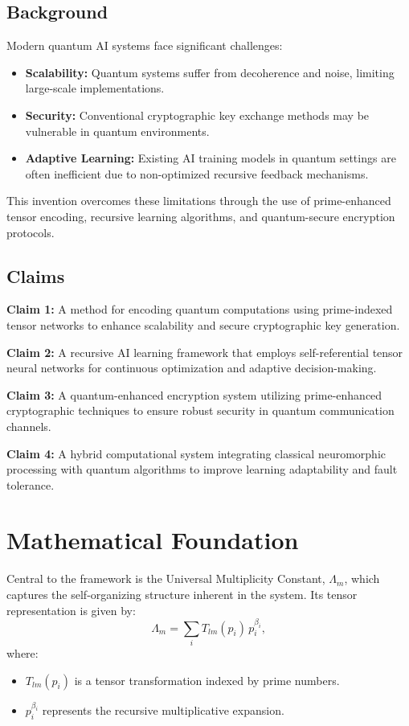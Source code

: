 \documentclass{article}
\theoremstyle{plain}
\begin{document}
\subsection{Background}
Modern quantum AI systems face significant challenges:
\begin{itemize}
    \item \textbf{Scalability:} Quantum systems suffer from decoherence and noise, limiting large-scale implementations.
    \item \textbf{Security:} Conventional cryptographic key exchange methods may be vulnerable in quantum environments.
    \item \textbf{Adaptive Learning:} Existing AI training models in quantum settings are often inefficient due to non-optimized recursive feedback mechanisms.
\end{itemize}
This invention overcomes these limitations through the use of prime-enhanced tensor encoding, recursive learning algorithms, and quantum-secure encryption protocols.

\subsection{Claims}
\textbf{Claim 1:} A method for encoding quantum computations using prime-indexed tensor networks to enhance scalability and secure cryptographic key generation.

\medskip
\textbf{Claim 2:} A recursive AI learning framework that employs self-referential tensor neural networks for continuous optimization and adaptive decision-making.

\medskip
\textbf{Claim 3:} A quantum-enhanced encryption system utilizing prime-enhanced cryptographic techniques to ensure robust security in quantum communication channels.

\medskip
\textbf{Claim 4:} A hybrid computational system integrating classical neuromorphic processing with quantum algorithms to improve learning adaptability and fault tolerance.

\section{Mathematical Foundation}
Central to the framework is the Universal Multiplicity Constant, $\Lambda_m$, which captures the self-organizing structure inherent in the system. Its tensor representation is given by:
\[
\Lambda_m = \sum_{i} T_{lm}(p_i) \, p_i^{\beta_i},
\]
where:
\begin{itemize}
    \item $T_{lm}(p_i)$ is a tensor transformation indexed by prime numbers.
    \item $p_i^{\beta_i}$ represents the recursive multiplicative expansion.
\end{itemize}
\end{document}
